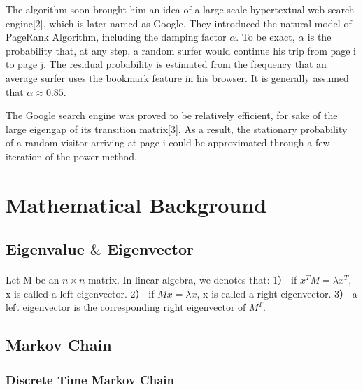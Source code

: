 \documentclass[a0,portrait]{a0poster}
\begin{document}
\begin{multicols}{2}
    The algorithm soon brought him an idea of a large-scale hypertextual web search engine[2], which is later named as Google.
    They introduced the natural model of PageRank Algorithm, including the damping factor $\alpha$. 
    To be exact, $\alpha$ is the probability that, at any step, a random surfer would continue his trip from page i to page j.
    The residual probability is estimated from the frequency that an average surfer uses the bookmark feature in his browser. It is generally assumed that $\alpha\approx0.85$.
    
    The Google search engine was proved to be relatively efficient, for sake of the large eigengap of its transition matrix[3]. 
    As a result, the stationary probability of a random visitor arriving at page i could be approximated through a few iteration of the power method.




\color{DarkSlateGray} %

\section*{Mathematical Background}
\subsection*{Eigenvalue $\&$ Eigenvector}
        \paragraph{}
        Let M be an $n\times n$ matrix. In linear algebra, we denotes that: 
            1） if $x^TM=\lambda x^T$, x is called a left eigenvector.
            2） if $Mx=\lambda x$, x is called a right eigenvector.
            3） a left eigenvector is the corresponding right eigenvector of $M^T$.
        
      \subsection*{Markov Chain}
      \subsubsection*{Discrete Time Markov Chain}

\end{multicols}
\end{document}
